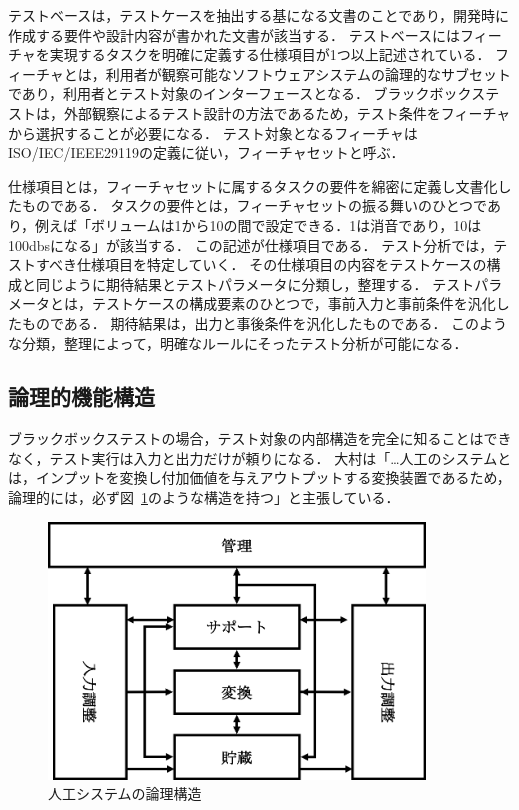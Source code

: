 テストベースは，テストケースを抽出する基になる文書のことであり，開発時に作成する要件や設計内容が書かれた文書が該当する．
テストベースにはフィーチャを実現するタスクを明確に定義する仕様項目が1つ以上記述されている．
フィーチャとは，利用者が観察可能なソフトウェアシステムの論理的なサブセットであり，利用者とテスト対象のインターフェースとなる\cite{kang1990feature}．
ブラックボックステストは，外部観察によるテスト設計の方法であるため，テスト条件をフィーチャから選択することが必要になる．
テスト対象となるフィーチャはISO/IEC/IEEE29119の定義に従い，フィーチャセットと呼ぶ\cite{ISO29119}．

仕様項目とは，フィーチャセットに属するタスクの要件を綿密に定義し文書化したものである．
タスクの要件とは，フィーチャセットの振る舞いのひとつであり，例えば「ボリュームは1から10の間で設定できる．1は消音であり，10は100dbsになる」が該当する．
この記述が仕様項目である．
テスト分析では，テストすべき仕様項目を特定していく．
その仕様項目の内容をテストケースの構成と同じように期待結果とテストパラメータに分類し，整理する．
テストパラメータとは，テストケースの構成要素のひとつで，事前入力と事前条件を汎化したものである．
期待結果は，出力と事後条件を汎化したものである．
このような分類，整理によって，明確なルールにそったテスト分析が可能になる．

\subsection{論理的機能構造}
ブラックボックステストの場合，テスト対象の内部構造を完全に知ることはできなく，テスト実行は入力と出力だけが頼りになる．
大村は「…人工のシステムとは，インプットを変換し付加価値を与えアウトプットする変換装置であるため，論理的には，必ず図~\ref{fig:D-2-FigLSOF}のような構造を持つ\cite{LSOF}」と主張している．
\begin{figure}[htbp]
  \begin{center}
	\includegraphics[width=10cm]{./image/D-2-FigLSOF.png}
	\caption{人工システムの論理構造}
	\label{fig:D-2-FigLSOF}
  \end{center}
\end{figure}

